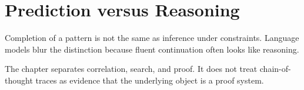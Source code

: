\chapter{Prediction versus Reasoning}
\label{ch:prediction-and-reasoning}

Completion of a pattern is not the same as inference under constraints. Language models blur the distinction because fluent continuation often looks like reasoning.

The chapter separates correlation, search, and proof. It does not treat chain-of-thought traces as evidence that the underlying object is a proof system.
